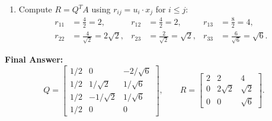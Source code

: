 \documentclass[11pt, letterpaper]{article}
\theoremstyle{definition}
\theoremstyle{remark}
\begin{document}
\begin{enumerate}[label=\textbf{Step \arabic*:}]
\[        v_3 = \begin{bmatrix} 0 \\ 4 \\ 2 \\ 2 \end{bmatrix} - \frac{8}{4}\begin{bmatrix} 1 \\ 1 \\ 1 \\ 1 \end{bmatrix} - \frac{2}{2}\begin{bmatrix} 0 \\ 1 \\ -1 \\ 0 \end{bmatrix} = \begin{bmatrix} -2 \\ 1 \\ 1 \\ 0 \end{bmatrix}, \qquad \|v_3\| = \sqrt{6}, \quad u_3 = \frac{1}{\sqrt{6}}\begin{bmatrix} -2 \\ 1 \\ 1 \\ 0 \end{bmatrix}.
    \]
    \item Compute $R = Q^T A$ using $r_{ij} = u_i \cdot x_j$ for $i \le j$:
    \begin{align*}
        r_{11} &= \frac{4}{2} = 2, & r_{12} &= \frac{4}{2} = 2, & r_{13} &= \frac{8}{2} = 4, \\
        r_{22} &= \frac{4}{\sqrt{2}} = 2\sqrt{2}, & r_{23} &= \frac{2}{\sqrt{2}} = \sqrt{2}, & r_{33} &= \frac{6}{\sqrt{6}} = \sqrt{6}.
    \end{align*}
\end{enumerate}
\textbf{Final Answer:}
\[
    Q = \begin{bmatrix}
        1/2 & 0 & -2/\sqrt{6} \\
        1/2 & 1/\sqrt{2} & 1/\sqrt{6} \\
        1/2 & -1/\sqrt{2} & 1/\sqrt{6} \\
        1/2 & 0 & 0
    \end{bmatrix}, \qquad
    R = \begin{bmatrix}
        2 & 2 & 4 \\
        0 & 2\sqrt{2} & \sqrt{2} \\
        0 & 0 & \sqrt{6}
    \end{bmatrix}.
\]
\end{document}

